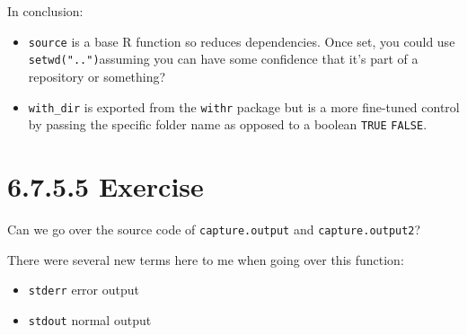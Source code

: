 \documentclass[]{book}
\providecommand{\tightlist}{%
  \setlength{\itemsep}{0pt}\setlength{\parskip}{0pt}}
\begin{document}
In conclusion:

\begin{itemize}
\item
  \texttt{source} is a base R function so reduces dependencies. Once set, you could use \texttt{setwd("..")}assuming you can have some confidence that it's part of a repository or something?
\item
  \texttt{with\_dir} is exported from the \texttt{withr} package but is a more fine-tuned control by passing the specific folder name as opposed to a boolean \texttt{TRUE} \textbar{} \texttt{FALSE}.
\end{itemize}

\hypertarget{exercise-6}{%
\section*{6.7.5.5 Exercise}\label{exercise-6}}

Can we go over the source code of \texttt{capture.output} and \texttt{capture.output2}?

There were several new terms here to me when going over this function:

\begin{itemize}
\tightlist
\item
  \texttt{stderr} error output
\item
  \texttt{stdout} normal output
\end{itemize}
\end{document}
